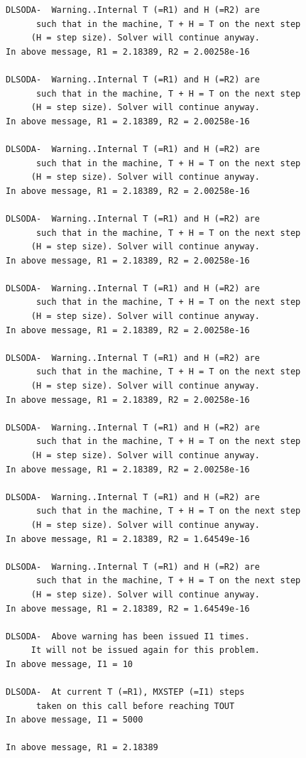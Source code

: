 \documentclass[a4paper]{article}\usepackage[]{graphicx}\usepackage[]{color}
\makeatletter
\newenvironment{kframe}{%
 \def\at@end@of@kframe{}%
 \ifinner\ifhmode%
  \def\at@end@of@kframe{\end{minipage}}%
  \begin{minipage}{\columnwidth}%
 \fi\fi%
 \def\FrameCommand##1{\hskip\@totalleftmargin \hskip-\fboxsep
 \colorbox{shadecolor}{##1}\hskip-\fboxsep
     \hskip-\linewidth \hskip-\@totalleftmargin \hskip\columnwidth}%
 \MakeFramed {\advance\hsize-\width
   \@totalleftmargin\z@ \linewidth\hsize
   \@setminipage}}%
 {\par\unskip\endMakeFramed%
 \at@end@of@kframe}
\newenvironment{knitrout}{}{} %
\makeatother
\begin{document}
\begin{knitrout}
\begin{kframe}
\begin{verbatim}
DLSODA-  Warning..Internal T (=R1) and H (=R2) are
      such that in the machine, T + H = T on the next step  
     (H = step size). Solver will continue anyway.
In above message, R1 = 2.18389, R2 = 2.00258e-16
 
DLSODA-  Warning..Internal T (=R1) and H (=R2) are
      such that in the machine, T + H = T on the next step  
     (H = step size). Solver will continue anyway.
In above message, R1 = 2.18389, R2 = 2.00258e-16
 
DLSODA-  Warning..Internal T (=R1) and H (=R2) are
      such that in the machine, T + H = T on the next step  
     (H = step size). Solver will continue anyway.
In above message, R1 = 2.18389, R2 = 2.00258e-16
 
DLSODA-  Warning..Internal T (=R1) and H (=R2) are
      such that in the machine, T + H = T on the next step  
     (H = step size). Solver will continue anyway.
In above message, R1 = 2.18389, R2 = 2.00258e-16
 
DLSODA-  Warning..Internal T (=R1) and H (=R2) are
      such that in the machine, T + H = T on the next step  
     (H = step size). Solver will continue anyway.
In above message, R1 = 2.18389, R2 = 2.00258e-16
 
DLSODA-  Warning..Internal T (=R1) and H (=R2) are
      such that in the machine, T + H = T on the next step  
     (H = step size). Solver will continue anyway.
In above message, R1 = 2.18389, R2 = 2.00258e-16
 
DLSODA-  Warning..Internal T (=R1) and H (=R2) are
      such that in the machine, T + H = T on the next step  
     (H = step size). Solver will continue anyway.
In above message, R1 = 2.18389, R2 = 2.00258e-16
 
DLSODA-  Warning..Internal T (=R1) and H (=R2) are
      such that in the machine, T + H = T on the next step  
     (H = step size). Solver will continue anyway.
In above message, R1 = 2.18389, R2 = 1.64549e-16
 
DLSODA-  Warning..Internal T (=R1) and H (=R2) are
      such that in the machine, T + H = T on the next step  
     (H = step size). Solver will continue anyway.
In above message, R1 = 2.18389, R2 = 1.64549e-16
 
DLSODA-  Above warning has been issued I1 times.  
     It will not be issued again for this problem.
In above message, I1 = 10
 
DLSODA-  At current T (=R1), MXSTEP (=I1) steps   
      taken on this call before reaching TOUT     
In above message, I1 = 5000
 
In above message, R1 = 2.18389
 
\end{verbatim}
\end{kframe}
\end{knitrout}
\end{document}
